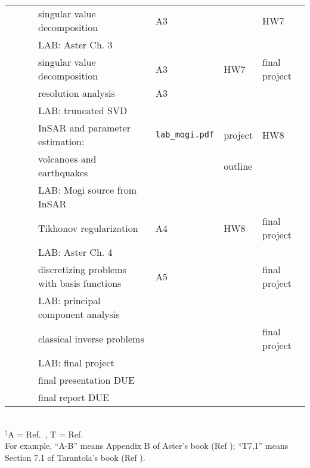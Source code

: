 \documentclass[10pt,titlepage,fleqn]{article}
\begin{document}
\begin{enumerate}
\begin{tabular}{cll|l|l|ll}
\hline
&   &  & singular value decomposition & A3 & & HW7 \\
&   &  & LAB: Aster Ch. 3 & & & \\
\hline
&  &  & singular value decomposition & A3 & HW7 & final project \\
&  &  & resolution analysis & A3 & & \\
&  &  & LAB: truncated SVD & & & \\
\hline
&   & & InSAR and parameter estimation: & \verb+lab_mogi.pdf+ & project & HW8 \\
&   &  & \hspace{5pt} volcanoes and earthquakes   & & outline & \\
&   &  & LAB: Mogi source from InSAR & & & \\
\hline
&   & & Tikhonov regularization & A4 & HW8 & final project \\
&   &  & LAB: Aster Ch. 4 & & & \\
\hline
&  &  & discretizing problems with basis functions & A5 & & final project  \\
&  &  & LAB: principal component analysis & & & \\
\hline
&   &  & classical inverse problems & & & final project \\
&   &  & LAB: final project & & & \\
\hline
&   &   & final presentation DUE & & &  \\
&   &   & final report DUE & & & \\ \hline
\hline
\end{tabular} \\
$^\dagger$A = Ref.~\cite{AsterE2}, T = Ref.~\cite{Tarantola2005} \\
For example, ``A-B'' means Appendix B of Aster's book (Ref \cite{AsterE2}); ``T7,1'' means Section 7.1 of Tarantola's book (Ref \cite{Tarantola2005}).

\pagebreak
{}


\end{enumerate}
\end{document}
